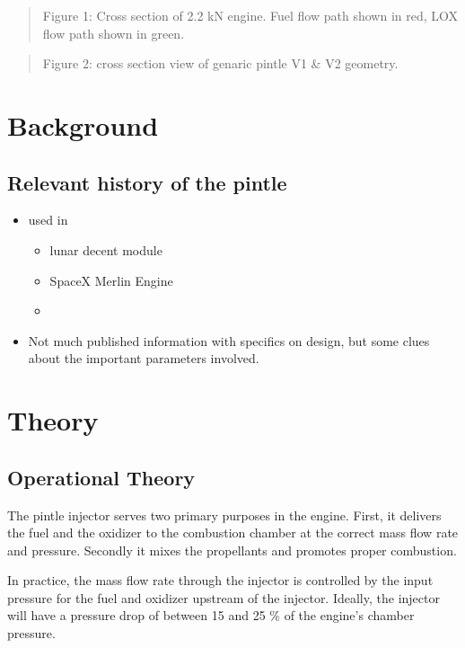 \documentclass[11pt]{article}
\providecommand{\tightlist}{%
      \setlength{\itemsep}{0pt}\setlength{\parskip}{0pt}}
\begin{document}
\begin{quote}
Figure 1: Cross section of 2.2 kN engine. Fuel flow path shown in red,
LOX flow path shown in green.
\end{quote}

\begin{quote}
Figure 2: cross section view of genaric pintle V1 \& V2 geometry.
\end{quote}

    \section{Background}\label{background}

\subsection{Relevant history of the
pintle}\label{relevant-history-of-the-pintle}

\begin{itemize}
\tightlist
\item
  used in

  \begin{itemize}
  \item
    lunar decent module
  \item
    SpaceX Merlin Engine
  \item
  \end{itemize}
\item
  Not much published information with specifics on design, but some
  clues about the important parameters involved.
\end{itemize}

    \section{Theory}\label{theory}

\subsection{Operational Theory}\label{operational-theory}

The pintle injector serves two primary purposes in the engine. First, it
delivers the fuel and the oxidizer to the combustion chamber at the
correct mass flow rate and pressure. Secondly it mixes the propellants
and promotes proper combustion.

In practice, the mass flow rate through the injector is controlled by
the input pressure for the fuel and oxidizer upstream of the injector.
Ideally, the injector will have a pressure drop of between 15 and 25 \%
of the engine's chamber pressure.
\end{document}
